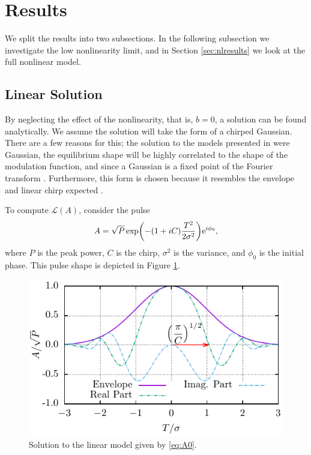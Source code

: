 \documentclass[10pt,twocolumn,a4paper]{article}
\let\originalleft\left
\let\originalright\right
\renewcommand{\left}{\mathopen{}\mathclose\bgroup\originalleft}
\renewcommand{\right}{\aftergroup\egroup\originalright}
\begin{document}
\section{Results}
\label{sec:results}
We split the results into two subsections. In the following subsection we investigate the low nonlinearity limit, and in Section \ref{sec:nlresults} we look at the full nonlinear model.

\subsection{Linear Solution}
By neglecting the effect of the nonlinearity, that is, $b = 0$, a solution can be found analytically. We assume the solution will take the form of a chirped Gaussian. There are a few reasons for this; the solution to the models presented in \cite{cutler1955, siegman1969, kuizenga1970a, martinez1984, martinez1985} were Gaussian, the equilibrium shape will be highly correlated to the shape of the modulation function, and since a Gaussian is a fixed point of the Fourier transform \cite{gradshteyn2007}. Furthermore, this form is chosen because it resembles the envelope and linear chirp expected \cite{burgoyne2014, haus1975, haus1996, haus2000, usechak2005}.

To compute $\mathcal{L}(A)$, consider the pulse
\begin{align}
	A = \sqrt{P} \exp \left( -(1 + iC) \frac{T^2}{2 \sigma^2} \right) \textrm{e}^{i \phi_0},
	\label{eq:A0}
\end{align}
where $P$ is the peak power, $C$ is the chirp, $\sigma^2$ is the variance, and $\phi_0$ is the initial phase. This pulse shape is depicted in Figure \ref{fig:samplegauss}.

\begin{figure}[tbp]
	\centering
	\includegraphics{Sample_Gauss}
	\caption{Solution to the linear model given by \eqref{eq:A0}.}
	\label{fig:samplegauss}
\end{figure}
\end{document}
